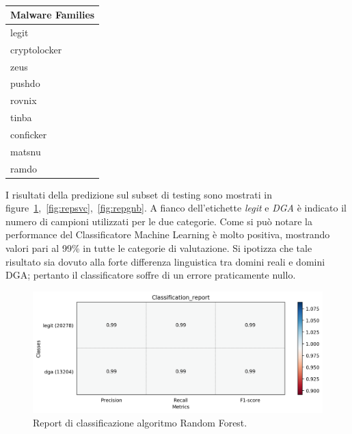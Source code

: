 \begin{table}[!bp]
    \centering
    \begin{tabular}[t]{l}
    \toprule
    Malware Families \\
    \midrule
	legit \\
	cryptolocker \\
	zeus \\
	pushdo \\
	rovnix \\
	tinba \\
	conficker \\
	matsnu \\
	ramdo \\
	\bottomrule
\end{tabular}
\caption{\label{tab:malware}}
\end{table}

I risultati della predizione sul subset di testing sono mostrati in figure~\ref{fig:repdga},~\ref{fig:repsvc},~\ref{fig:repgnb}. A fianco dell'etichette \textit{legit} e \textit{DGA} è indicato il numero di campioni utilizzati per le due categorie. Come si può notare la performance del Classificatore Machine Learning è molto positiva, mostrando valori pari al 99\% in tutte le categorie di valutazione.  Si ipotizza che tale risultato sia dovuto alla forte differenza linguistica tra domini reali e domini DGA; pertanto il classificatore soffre di un errore praticamente nullo. 

\begin{figure}[!bp]
    \centering
    \includegraphics[width=\columnwidth]{figures/rndf_tra_nosup_nosup/class_rep.png}
    \caption{Report di classificazione algoritmo Random Forest.\label{fig:repdga}}
\end{figure}

